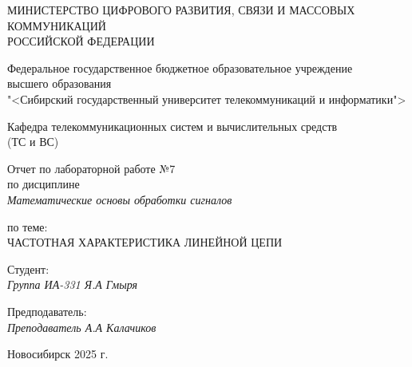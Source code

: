 \thispagestyle{empty}

\begin{center}
    МИНИСТЕРСТВО ЦИФРОВОГО РАЗВИТИЯ, СВЯЗИ И МАССОВЫХ КОММУНИКАЦИЙ \\ РОССИЙСКОЙ ФЕДЕРАЦИИ

    \vspace{20pt}

    Федеральное государственное бюджетное образовательное учреждение  \\  высшего образования \\
    "<Сибирский государственный университет телекоммуникаций и информатики"> \\

    \vspace{20pt}

    Кафедра телекоммуникационных систем и вычислительных средств \\  (ТС и ВС)
\end{center}

\vfill

\begin{center}
    Отчет по лабораторной работе №7 \\  
    по дисциплине \\
    \textit{Математические основы обработки сигналов}

    \vspace{20pt}

    по теме: \\
    \uppercase{Частотная характеристика линейной цепи}
\end{center}

\vfill

    \noindent Студент: \\
    \textit{Группа ИА-331 \hfill Я.А Гмыря}

    \vspace{20pt}

    \noindent Предподаватель: \\
    \textit{Преподаватель \hfill А.А Калачиков}

\vfill

\begin{center}
    Новосибирск 2025 г.
\end{center}